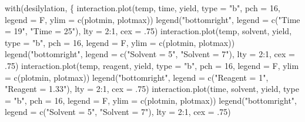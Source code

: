 \documentclass[
]{book}
\newenvironment{Shaded}{\begin{snugshade}}{\end{snugshade}}
\newcommand{\AttributeTok}[1]{\textcolor[rgb]{0.77,0.63,0.00}{#1}}
\newcommand{\DecValTok}[1]{\textcolor[rgb]{0.00,0.00,0.81}{#1}}
\newcommand{\FunctionTok}[1]{\textcolor[rgb]{0.00,0.00,0.00}{#1}}
\newcommand{\NormalTok}[1]{#1}
\newcommand{\SpecialCharTok}[1]{\textcolor[rgb]{0.00,0.00,0.00}{#1}}
\newcommand{\StringTok}[1]{\textcolor[rgb]{0.31,0.60,0.02}{#1}}
\theoremstyle{definition}
\theoremstyle{definition}
\theoremstyle{definition}
\theoremstyle{definition}
\theoremstyle{remark}
\begin{document}
\begin{Shaded}
\begin{Highlighting}[]
\FunctionTok{with}\NormalTok{(desilylation, \{}
  \FunctionTok{interaction.plot}\NormalTok{(temp, time, yield, }\AttributeTok{type =} \StringTok{"b"}\NormalTok{, }\AttributeTok{pch =} \DecValTok{16}\NormalTok{, }\AttributeTok{legend =}\NormalTok{ F, }
                   \AttributeTok{ylim =} \FunctionTok{c}\NormalTok{(plotmin, plotmax))}
  \FunctionTok{legend}\NormalTok{(}\StringTok{"bottomright"}\NormalTok{, }\AttributeTok{legend =} \FunctionTok{c}\NormalTok{(}\StringTok{"Time = 19"}\NormalTok{, }\StringTok{"Time = 25"}\NormalTok{), }\AttributeTok{lty =} \DecValTok{2}\SpecialCharTok{:}\DecValTok{1}\NormalTok{, }\AttributeTok{cex =}\NormalTok{ .}\DecValTok{75}\NormalTok{)}
  \FunctionTok{interaction.plot}\NormalTok{(temp, solvent, yield, }\AttributeTok{type =} \StringTok{"b"}\NormalTok{, }\AttributeTok{pch =} \DecValTok{16}\NormalTok{, }\AttributeTok{legend =}\NormalTok{ F, }
                   \AttributeTok{ylim =} \FunctionTok{c}\NormalTok{(plotmin, plotmax))}
  \FunctionTok{legend}\NormalTok{(}\StringTok{"bottomright"}\NormalTok{, }\AttributeTok{legend =} \FunctionTok{c}\NormalTok{(}\StringTok{"Solvent = 5"}\NormalTok{, }\StringTok{"Solvent = 7"}\NormalTok{), }\AttributeTok{lty =} \DecValTok{2}\SpecialCharTok{:}\DecValTok{1}\NormalTok{, }\AttributeTok{cex =}\NormalTok{ .}\DecValTok{75}\NormalTok{)}
  \FunctionTok{interaction.plot}\NormalTok{(temp, reagent, yield, }\AttributeTok{type =} \StringTok{"b"}\NormalTok{, }\AttributeTok{pch =} \DecValTok{16}\NormalTok{, }\AttributeTok{legend =}\NormalTok{ F, }
                   \AttributeTok{ylim =} \FunctionTok{c}\NormalTok{(plotmin, plotmax))}
  \FunctionTok{legend}\NormalTok{(}\StringTok{"bottomright"}\NormalTok{, }\AttributeTok{legend =} \FunctionTok{c}\NormalTok{(}\StringTok{"Reagent = 1"}\NormalTok{, }\StringTok{"Reagent = 1.33"}\NormalTok{), }\AttributeTok{lty =} \DecValTok{2}\SpecialCharTok{:}\DecValTok{1}\NormalTok{, }\AttributeTok{cex =}\NormalTok{ .}\DecValTok{75}\NormalTok{)}
  \FunctionTok{interaction.plot}\NormalTok{(time, solvent, yield, }\AttributeTok{type =} \StringTok{"b"}\NormalTok{, }\AttributeTok{pch =} \DecValTok{16}\NormalTok{, }\AttributeTok{legend =}\NormalTok{ F, }
                   \AttributeTok{ylim =} \FunctionTok{c}\NormalTok{(plotmin, plotmax))}
  \FunctionTok{legend}\NormalTok{(}\StringTok{"bottomright"}\NormalTok{, }\AttributeTok{legend =} \FunctionTok{c}\NormalTok{(}\StringTok{"Solvent = 5"}\NormalTok{, }\StringTok{"Solvent = 7"}\NormalTok{), }\AttributeTok{lty =} \DecValTok{2}\SpecialCharTok{:}\DecValTok{1}\NormalTok{, }\AttributeTok{cex =}\NormalTok{ .}\DecValTok{75}\NormalTok{)}

\end{Highlighting}
\end{Shaded}
\end{document}
